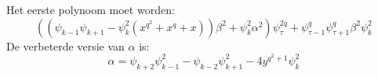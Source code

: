 

Het eerste polynoom moet worden:
$$  ((\psi_{k-1}\psi_{k+1} - \psi_k^2({x^{q^2}}+x^q+x))\beta^2+\psi_k^2\alpha^2)\psi_\tau^{2q}+\psi_{\tau-1}^q \psi_{\tau+1}^q\beta^2\psi_k^2 $$
De verbeterde versie van $\alpha$ is:
$$ \alpha=\psi_{k+2}\psi_{k-1}^2-\psi_{k-2}\psi_{k+1}^2-4y^{q^2+1}\psi_k^2 $$
